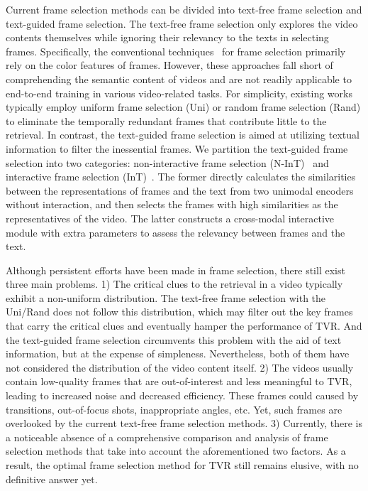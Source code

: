 \documentclass[11pt]{article}
\begin{document}
Current frame selection methods can be divided into text-free frame selection and text-guided frame selection. 
The text-free frame selection only explores the video contents themselves while ignoring their relevancy to the texts in selecting frames.
Specifically, the conventional techniques~\cite{chang1999efficient, divakaran2002motion, chang2003content} for frame selection primarily rely on the color features of frames.
However, these approaches fall short of comprehending the semantic content of videos and are not readily applicable to end-to-end training in various video-related tasks. 
For simplicity, existing works \cite{lei2021less, luo2022clip4clip, li2022align} typically employ uniform frame selection (Uni) or random frame selection (Rand) to eliminate the temporally redundant frames that contribute little to the retrieval.
In contrast, the text-guided frame selection is aimed at utilizing textual information to filter the inessential frames.
We partition the text-guided frame selection into two categories: non-interactive frame selection (N-InT)~\cite{gorti2022x, han2022efficient} and interactive frame selection (InT)~\cite{buch2022revisiting, yang2023learning, wang2022contrastive, lin2022smaug}.
The former directly calculates the similarities between the representations of frames and the text from two unimodal encoders without interaction, and then selects the frames with high similarities as the representatives of the video.
The latter constructs a cross-modal interactive module with extra parameters to assess the relevancy between frames and the text.

Although persistent efforts have been made in frame selection, there still exist three main problems.
1) The critical clues to the retrieval in a video typically exhibit a non-uniform distribution.
The text-free frame selection with the Uni/Rand does not follow this distribution, which may filter out the key frames that carry the critical clues and eventually hamper the performance of TVR.
And the text-guided frame selection circumvents this problem with the aid of text information, but at the expense of simpleness.
Nevertheless, both of them have not considered the distribution of the video content itself.
2) The videos usually contain low-quality frames that are out-of-interest and less meaningful to TVR, leading to increased noise and decreased efficiency. 
These frames could caused by transitions, out-of-focus shots, inappropriate angles, etc. 
Yet, such frames are overlooked by the current text-free frame selection methods.
3) Currently, there is a noticeable absence of a comprehensive comparison and analysis of frame selection methods that take into account the aforementioned two factors. 
As a result, the optimal frame selection method for TVR still remains elusive, with no definitive answer yet.
\end{document}
